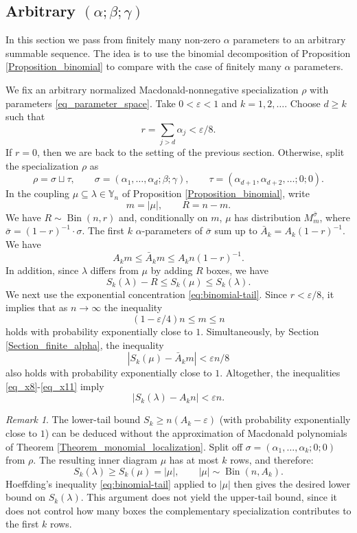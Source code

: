 \documentclass[11pt,reqno]{amsart}
\theoremstyle{definition}
\theoremstyle{remark}
\newtheorem{remark}[theorem]{Remark}
\numberwithin{equation}{section}
\newcommand{\Y}{\mathbb Y}
\newcommand{\eps}{\varepsilon}
\DeclareMathOperator{\Bin}{Bin}
\begin{document}
\subsection{Arbitrary $(\alpha;\beta;\gamma)$}
In this section we pass from finitely many non-zero $\alpha$ parameters to an arbitrary summable
sequence. The idea is to use the binomial decomposition of Proposition \ref{Proposition_binomial} to compare with the case of finitely many $\alpha$ parameters.

We fix an arbitrary normalized Macdonald-nonnegative specialization $\rho$ with parameters
\eqref{eq_parameter_space}. Take $0<\varepsilon<1$ and $k=1,2,\dots$. Choose $d\ge k$ such that
\[
 r=\sum_{j>d}\alpha_j<\varepsilon/8.
\]
If $r=0$, then we are back to the setting of the previous section. Otherwise, split the specialization $\rho$ as
\[
 \rho=\sigma\sqcup \tau,\qquad \sigma=(\alpha_1,\ldots,\alpha_d;\beta;\gamma),\qquad
 \tau=(\alpha_{d+1},\alpha_{d+2},\ldots;0;0).
\]
In the coupling $\mu\subseteq\lambda\in\Y_n$ of Proposition \ref{Proposition_binomial}, write
\[
 m=|\mu|,\qquad R=n-m.
\]
We have $R\sim\Bin(n,r)$ and, conditionally on $m$,
$\mu$ has distribution $M_m^{\bar\sigma}$, where $\bar\sigma=(1-r)^{-1}\cdot\sigma$.
The first $k$ $\alpha$-parameters of $\bar\sigma$ sum up to
$\bar A_k=A_k(1-r)^{-1}$. We have
\begin{equation}\label{eq_x8}
 A_k m \le\bar A_k m \le A_k n (1-r)^{-1}.
\end{equation}
In addition, since $\lambda$ differs from $\mu$ by adding $R$ boxes, we have
\begin{equation}\label{eq_x9}
 S_k(\lambda)-R\le S_k(\mu) \le S_k(\lambda).
\end{equation}
We next use the exponential concentration \eqref{eq:binomial-tail}. Since $r<\eps/8$, it implies that as $n\to\infty$ the inequality
\begin{equation}
\label{eq_x10}
 (1-\eps/4)n \le m \le n
\end{equation}
holds with probability exponentially close to $1$. Simultaneously, by Section \ref{Section_finite_alpha}, the inequality
\begin{equation}
\label{eq_x11}
 |S_k(\mu)-\bar A_k m|<\eps n /8
\end{equation}
also holds with probability exponentially close to $1$. Altogether, the inequalities \eqref{eq_x8}-\eqref{eq_x11} imply
$$
 |S_k(\lambda)- A_k n|<\eps n.
$$

\begin{remark}\label{rem:binomial-lower}
The lower-tail bound $S_k\ge n (A_k-\eps)$ (with probability exponentially close to $1$) can be deduced without the approximation of Macdonald polynomials of Theorem \ref{Theorem_monomial_localization}. Split off
$\sigma=(\alpha_1,\ldots,\alpha_k;0;0)$ from $\rho$. The resulting inner diagram
$\mu$ has at most $k$ rows, and therefore:
\[
 S_k(\lambda)\ge S_k(\mu)=|\mu|,\qquad
 |\mu|\sim\Bin(n,A_k).
\]
Hoeffding's inequality \eqref{eq:binomial-tail} applied to $|\mu|$ then gives the desired lower bound on $S_k(\lambda)$.
This argument does not yield the upper-tail bound, since it
does not control how many boxes the complementary specialization
contributes to the first $k$ rows. 
\end{remark}
\end{document}

